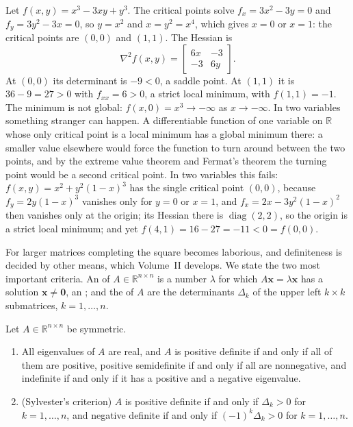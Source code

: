 Let $f(x,y)=x^3-3xy+y^3$. The critical points solve $f_x=3x^2-3y=0$ and $f_y=3y^2-3x=0$, so $y=x^2$ and $x=y^2=x^4$, which gives $x=0$ or $x=1$: the critical points are $(0,0)$ and $(1,1)$. The Hessian is
\[
\nabla^2f(x,y)=\begin{bmatrix}6x&-3\\-3&6y\end{bmatrix}.
\]
At $(0,0)$ its determinant is $-9<0$, a saddle point. At $(1,1)$ it is $36-9=27>0$ with $f_{xx}=6>0$, a strict local minimum, with $f(1,1)=-1$. The minimum is not global: $f(x,0)=x^3\to-\infty$ as $x\to-\infty$. In two variables something stranger can happen. A differentiable function of one variable on $\mathbb R$ whose only critical point is a local minimum has a global minimum there: a smaller value elsewhere would force the function to turn around between the two points, and by the extreme value theorem and Fermat's theorem the turning point would be a second critical point. In two variables this fails: $f(x,y)=x^2+y^2(1-x)^3$ has the single critical point $(0,0)$, because $f_y=2y(1-x)^3$ vanishes only for $y=0$ or $x=1$, and $f_x=2x-3y^2(1-x)^2$ then vanishes only at the origin; its Hessian there is $\operatorname{diag}(2,2)$, so the origin is a strict local minimum; and yet $f(4,1)=16-27=-11<0=f(0,0)$.

For larger matrices completing the square becomes laborious, and definiteness is decided by other means, which Volume~II develops. We state the two most important criteria. An  of $A\in\mathbb R^{n\times n}$ is a number $\lambda$ for which $A\mathbf x=\lambda\mathbf x$ has a solution $\mathbf x\ne\mathbf0$, an ; and the  of $A$ are the determinants $\Delta_k$ of the upper left $k\times k$ submatrices, $k=1,\ldots,n$.

\begin{theorem}
\label{thm:definiteness-criteria}
Let $A\in\mathbb R^{n\times n}$ be symmetric.
\begin{enumerate}
\item All eigenvalues of $A$ are real, and $A$ is positive definite if and only if all of them are positive, positive semidefinite if and only if all are nonnegative, and indefinite if and only if it has a positive and a negative eigenvalue.
\item (Sylvester's criterion) $A$ is positive definite if and only if $\Delta_k>0$ for $k=1,\ldots,n$, and negative definite if and only if $(-1)^k\Delta_k>0$ for $k=1,\ldots,n$.
\end{enumerate}
\end{theorem}

